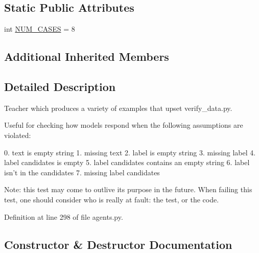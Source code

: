 \subsection*{Static Public Attributes}
\begin{DoxyCompactItemize}
\item 
int \hyperlink{classparlai_1_1tasks_1_1integration__tests_1_1agents_1_1BadExampleTeacher_aa13107dbd3fd1bbff91491e2860ea6dc}{N\+U\+M\+\_\+\+C\+A\+S\+ES} = 8
\end{DoxyCompactItemize}
\subsection*{Additional Inherited Members}


\subsection{Detailed Description}
\begin{DoxyVerb}Teacher which produces a variety of examples that upset verify_data.py.

Useful for checking how models respond when the following assumptions are
violated:

    0. text is empty string
    1. missing text
    2. label is empty string
    3. missing label
    4. label candidates is empty
    5. label candidates contains an empty string
    6. label isn't in the candidates
    7. missing label candidates

Note: this test may come to outlive its purpose in the future. When failing
this test, one should consider who is really at fault: the test, or the code.
\end{DoxyVerb}
 

Definition at line 298 of file agents.\+py.



\subsection{Constructor \& Destructor Documentation}
\mbox{\label{classparlai_1_1tasks_1_1integration__tests_1_1agents_1_1BadExampleTeacher_a977f478a2379e0f40525f3dd5408a87c}} 
